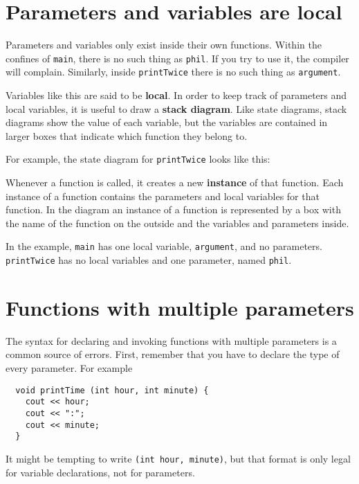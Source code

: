 \section {Parameters and variables are local}

Parameters and
variables only exist inside their own functions.  Within the
confines of {\tt main}, there is no such thing as {\tt phil}.
If you try to use it, the compiler will complain.  Similarly,
inside {\tt printTwice} there is no such thing as {\tt argument}.

Variables like this are said to be {\bf local}.  In order to
keep track of parameters and local variables, it is useful to
draw a {\bf stack diagram}.  Like state diagrams, stack diagrams
show the value of each variable, but the variables are contained
in larger boxes that indicate which function they belong to.

For example, the state diagram for {\tt printTwice} looks 
like this:

\vspace{0.1in}
\centerline{}
\vspace{0.1in}
%
Whenever a function is called, it creates a new {\bf instance}
of that function.  Each instance of a function contains the
parameters and local variables for that function.  In the
diagram an instance of a function is represented by a box
with the name of the function on the outside and the variables
and parameters inside.

In the example, {\tt main} has one local variable, {\tt argument}, and
no parameters.  {\tt printTwice} has no local variables and one
parameter, named {\tt phil}.

\section {Functions with multiple parameters}

The syntax for declaring and invoking functions with multiple
parameters is a common source of errors.  First, remember
that you have to declare the type of every parameter.  For
example

\begin{verbatim}
  void printTime (int hour, int minute) {
    cout << hour;
    cout << ":";
    cout << minute;
  }
\end{verbatim}
%
It might be tempting to write {\tt (int hour, minute)}, but
that format is only legal for variable declarations, not
for parameters.

